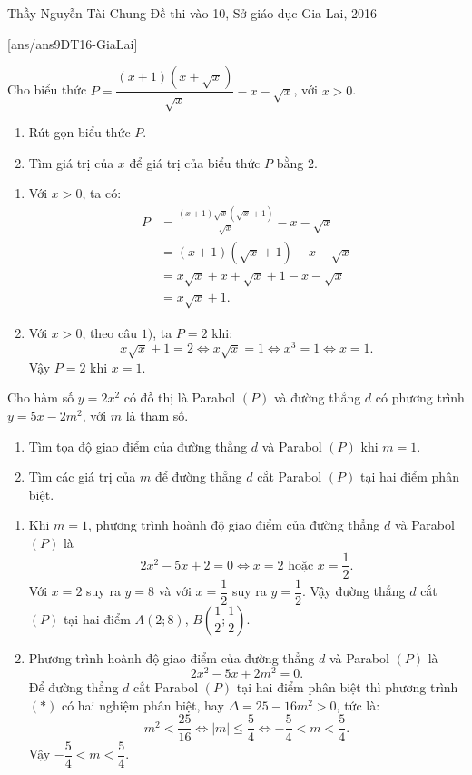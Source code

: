 \begin{name}
{Thầy  Nguyễn Tài Chung}
{Đề thi vào 10, Sở giáo dục Gia Lai, 2016}
\end{name}
\setcounter{ex}{0}
[ans/ans9DT16-GiaLai]
\begin{ex}%
Cho biểu thức $ P = \dfrac{{\left( {x + 1} \right)\left( {x + \sqrt x } \right)}}{{\sqrt x }} - x - \sqrt x$, với $x > 0$.
\begin{enumerate}
		\item 	Rút gọn biểu thức $P$.
		\item 	Tìm giá trị của $x$ để giá trị của biểu thức $P$ bằng $2$.
\end{enumerate}
\loigiai
{
\begin{enumerate}
	\item  Với $x > 0$, ta có:
{\allowdisplaybreaks
	\begin{align*}
	P &= \frac{(x + 1)\sqrt x \left( {\sqrt x  + 1} \right)}{\sqrt x } - x - \sqrt x \\
	&= (x + 1)\left( {\sqrt x  + 1} \right) - x - \sqrt x \\
	&= x\sqrt x  + x + \sqrt x  + 1 - x - \sqrt x \\
	&= x\sqrt x  + 1.
	\end{align*}}
\item Với $x>0$, theo câu $1)$, ta $P = 2$ khi:
$$x\sqrt x  + 1 = 2 \Leftrightarrow x\sqrt x  = 1
\Leftrightarrow {x^3} = 1
\Leftrightarrow x = 1.$$  
Vậy $P = 2$ khi $x = 1$.
\end{enumerate}
}
\end{ex}
\begin{ex}%
Cho hàm số $y=2x^2$ có đồ thị là Parabol $(P)$ và đường thẳng $d$ có phương trình $y=5x-2m^2$, với $m$ là tham số.
	\begin{enumerate}
		\item Tìm tọa độ giao điểm của đường thẳng $d$ và Parabol $(P)$ khi $m = 1$.
		\item 	Tìm các giá trị của $m$ để đường thẳng $d$ cắt Parabol $(P)$ tại hai điểm phân biệt.
	\end{enumerate}
\loigiai
{
\begin{enumerate}
\item  Khi $m = 1$, phương trình hoành độ giao điểm của đường thẳng $d$ và Parabol $(P)$ là 
\[2x^2-5x+2=0 \Leftrightarrow x=2 \,\, \text{hoặc} \,\,  x=\frac{1}{2}.\]
Với $x = 2$ suy ra $y = 8$ và với $x=\dfrac{1}{2}$ suy ra $y=\dfrac{1}{2}$.
Vậy đường thẳng $d$ cắt $(P)$ tại hai điểm  $A(2;8)$, $B\left( \dfrac{1}{2};\dfrac{1}{2} \right)$.
\item Phương trình hoành độ giao điểm của đường thẳng $d$ và Parabol $(P)$ là 
\[2x^2 - 5x + 2m^2 = 0.\tag{*}\]
Để đường thẳng $d$ cắt Parabol $(P)$ tại hai điểm phân biệt thì phương trình $(*)$ có hai nghiệm phân biệt, hay $\Delta  = 25 - 16m^2 > 0$, tức là:
$$m^2 < \frac{25}{16} \Leftrightarrow \left| m \right| \le \frac{5}{4} \Leftrightarrow  - \frac{5}{4} < m < \frac{5}{4}.$$
Vậy $ - \dfrac{5}{4} < m < \dfrac{5}{4}.$
\end{enumerate}
	}
\end{ex}
